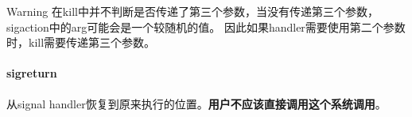 \documentclass[UTF8]{ctexart}
\begin{document}
\begin{mybox}{Warning}
    在kill中并不判断是否传递了第三个参数，当没有传递第三个参数，sigaction中的arg可能会是一个较随机的值。
    因此如果handler需要使用第二个参数时，kill需要传递第三个参数。
\end{mybox}

\paragraph{sigreturn} 从signal handler恢复到原来执行的位置。\textbf{用户不应该直接调用这个系统调用}。




\end{document}
